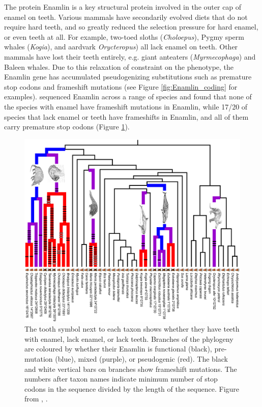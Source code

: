 The protein Enamlin is a key structural protein involved in the outer cap of enamel on teeth. Various mammals have secondarily evolved diets that do not require hard teeth, and so greatly reduced the selection pressure for hard enamel, or even teeth at all. For example, two-toed sloths ({\it Choloepus}), Pygmy sperm whales ({\it Kogia}), and aardvark {\it Orycteropus}) all lack  enamel on teeth. Other mammals have lost their teeth entirely, e.g. giant anteaters ({\it Myrmecophaga}) and Baleen whales. Due to this relaxation of constraint on the phenotype, the Enamlin gene has accumulated pseudogenizing substitutions such as premature stop codons and frameshift mutations (see Figure \ref{fig:Enamlin_coding}
for examples).  \citeauthor{Meredith:09} sequenced Enamlin across a
range of species and found that none of the species with enamel have frameshift
mutations in Enamlin, while 17/20 of species that lack enamel or teeth have
frameshifts in Enamlin, and all of them carry premature stop codons
(Figure \ref{fig:Enamlin_phylo}). 

\begin{figure}
\begin{center}
\includegraphics[width= \textwidth]{Journal_figs/genetic_drift/Enamelin/Enamlin_phylo.pdf}
\end{center}
\caption{The tooth symbol next to each taxon shows whether they have
  teeth with enamel, lack enamel, or lack teeth. Branches of the phylogeny are coloured by whether their
  Enamlin is functional (black), pre-mutation (blue), mixed (purple), or pseudogenic (red). The black and white vertical bars on branches show frameshift
  mutations.  The numbers after taxon names indicate minimum number of
  stop codons in the sequence divided by  the length of the sequence. Figure from \citet{Meredith:09}, \PLOSccBY.} \label{fig:Enamlin_phylo}  
\end{figure} 

